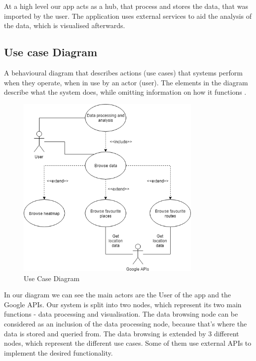 \documentclass[12p]{article}
\begin{document}
    At a high level our app acts as a hub, that process and stores the data, that was imported by the user. The application uses external services to aid the analysis of the data, which is visualised afterwards.
    
    \newpage
    \subsection{Use case Diagram}
    A behavioural diagram that describes actions (use cases) that systems perform when they operate, when in use by an actor (user). The elements in the diagram describe what the system does, while omitting information on how it functions \cite{UseCaseDiagram}. 
    
    \begin{figure}[H]
        \center
        \includegraphics[width=0.8\textwidth,keepaspectratio]{pics/diagrams/UseCaseDiagram.png}
	    \caption{Use Case Diagram}
    \end{figure}

    In our diagram we can see the main actors are the User of the app and the Google APIs. Our system is split into two nodes, which represent its two main functions - data processing and visualisation. The data browsing node can be considered as an inclusion of the data processing node, because that's where the data is stored and queried from. The data browsing is extended by 3 different nodes, which represent the different use cases. Some of them use external APIs to implement the desired functionality.
    
\end{document}

